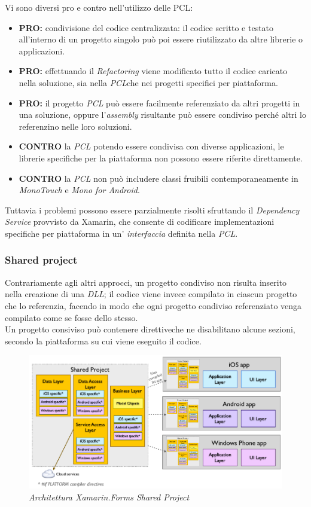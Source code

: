 Vi sono diversi pro e contro nell'utilizzo delle PCL:
\begin{itemize}
	\item \textbf{PRO:} condivisione del codice centralizzata: il codice scritto e testato all'interno di un progetto singolo può poi essere riutilizzato da altre librerie o applicazioni.
	\item \textbf{PRO:} effettuando il \textit{Refactoring} viene modificato tutto il codice caricato nella soluzione, sia nella \textit{PCL}che nei progetti specifici per piattaforma.
	\item \textbf{PRO:} il progetto \textit{PCL} può essere facilmente referenziato da altri progetti in una soluzione, oppure l'\textit{assembly} risultante può essere condiviso perché altri lo referenzino nelle loro soluzioni.
	\item \textbf{CONTRO} la \textit{PCL} potendo essere condivisa con diverse applicazioni, le librerie specifiche per la piattaforma non possono essere riferite direttamente.
	\item \textbf{CONTRO} la \textit{PCL} non può includere classi fruibili contemporaneamente in \textit{MonoTouch} e \textit{Mono for Android}. 
\end{itemize}
Tuttavia i problemi possono essere parzialmente risolti sfruttando il \textit{Dependency Service} provvisto da Xamarin, che consente di codificare implementazioni specifiche per piattaforma in un' \textit{interfaccia} definita nella \textit{PCL}.
\subsubsection{Shared project}
Contrariamente agli altri approcci, un progetto condiviso non risulta inserito nella creazione di una \textit{DLL}; il codice viene invece compilato in ciascun progetto che lo referenzia, facendo in modo che ogni progetto condiviso referenziato venga compilato come se fosse dello stesso.
\\
Un progetto consiviso può contenere direttiveche ne disabilitano alcune sezioni, secondo la piattaforma su cui viene eseguito il codice.

\begin{figure}[ht]
	\centering
	\includegraphics[scale=0.39]{immagini/progettazione/SharedAssetProject.png}
	\caption{\textit{Architettura Xamarin.Forms Shared Project}}
\end{figure}\FloatBarrier

